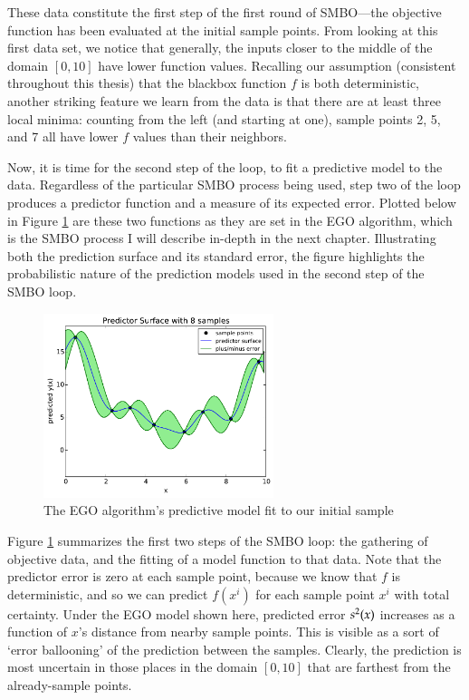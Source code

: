 These data constitute the first step of the first round of SMBO---the objective function has been evaluated at the initial sample points. From looking at this first data set, we notice that generally, the inputs closer to the middle of the domain $[0,10]$ have lower function values. Recalling our assumption (consistent throughout this thesis) that the blackbox function $f$ is both deterministic, another striking feature we learn from the data is that there are at least three local minima: counting from the left (and starting at one), sample points 2, 5, and 7 all have lower $f$ values than their neighbors.


Now, it is time for the second step of the loop, to fit a predictive model to the data. Regardless of the particular SMBO process being used, step two of the loop produces a predictor function and a measure of its expected error. Plotted below in Figure \ref{fig:first_model} are these two functions as they are set in the EGO algorithm, which is the SMBO process I will describe in-depth in the next chapter. Illustrating both the prediction surface and its standard error, the figure highlights the probabilistic nature of the prediction models used in the second step of the SMBO loop.

\begin{figure}[h]
\centering
\includegraphics[width=0.6\textwidth]{images/ego_ex/just_pred}
\caption{The EGO algorithm's predictive model fit to our initial sample}
\label{fig:first_model}
\end{figure}

Figure \ref{fig:first_model} summarizes the first two steps of the SMBO loop: the gathering of objective data, and the fitting of a model function to that data. Note that the predictor error is zero at each sample point, because we know that $f$ is deterministic, and so we can predict $f(x^i)$ for each sample point $x^i$ with total certainty. Under the EGO model shown here, predicted error $s^2(x)$ increases as a function of $x$'s distance from nearby sample points. This is visible as a sort of `error ballooning' of the prediction between the samples. Clearly, the prediction is most uncertain in those places in the domain $[0,10]$ that are farthest from the already-sample points.


